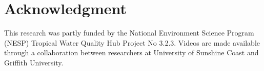 \documentclass[conference]{IEEEtran}       %
\begin{document}
\section*{Acknowledgment}
This research was partly funded by the National Environment Science Program (NESP) Tropical Water Quality Hub Project No 3.2.3. Videos are made available through a collaboration between researchers at University of Sunshine Coast and Griffith University.
\end{document}
